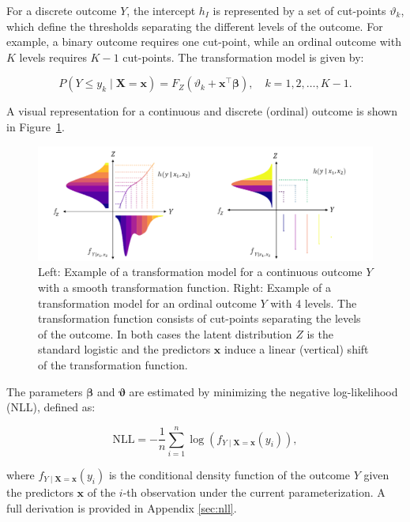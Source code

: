 For a discrete outcome $Y$, the intercept $h_I$ is represented by a set of cut-points $\vartheta_k$, which define the thresholds separating the different levels of the outcome. For example, a binary outcome requires one cut-point, while an ordinal outcome with $K$ levels requires $K-1$ cut-points. The transformation model is given by:

\begin{equation}
P(Y \leq y_k \mid \mathbf{X} = \mathbf{x}) = F_Z(\vartheta_k + \mathbf{x}^\top \boldsymbol{\beta}), \quad k = 1, 2, \ldots, K - 1.
\end{equation}


A visual representation for a continuous and discrete (ordinal) outcome is shown in Figure~\ref{fig:tram_cont_ord}.


\begin{figure}[H]
\centering
\includegraphics[width=1\textwidth]{img/tram_cont_ord.png}
\caption{Left: Example of a transformation model for a continuous outcome $Y$ with a smooth transformation function. Right: Example of a transformation model for an ordinal outcome $Y$ with 4 levels. The transformation function consists of cut-points separating the levels of the outcome.
In both cases the latent distribution $Z$ is the standard logistic and the predictors $\mathbf{x}$ induce a linear (vertical) shift of the transformation function.}
\label{fig:tram_cont_ord}
\end{figure}


The parameters $\boldsymbol{\beta}$ and $\boldsymbol{\vartheta}$ are estimated by minimizing the negative log-likelihood (NLL), defined as:


\begin{equation}
\text{NLL} = - \frac{1}{n} \sum_{i=1}^{n} \log \left(f_{Y \mid \mathbf{X} = \mathbf{x}}(y_i)\right),
\label{eq:nll_tram}
\end{equation}

where $f_{Y \mid \mathbf{X} = \mathbf{x}}(y_i)$ is the conditional density function of the outcome $Y$ given the predictors $\mathbf{x}$ of the $i$-th observation under the current parameterization. A full derivation is provided in Appendix \ref{sec:nll}.

